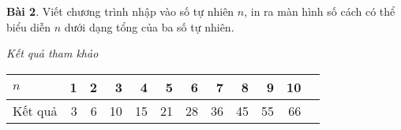 \documentclass[12pt, a4paper]{article}
\begin{document}
    \textbf{Bài 2}. Viết chương trình nhập vào số tự nhiên $n$, in ra màn hình số cách có thể biểu diễn $n$
    dưới dạng tổng của ba số tự nhiên.
    
    \textit{Kết quả tham khảo}
    \begin{table}[h]
        \centering
        \begin{tabular}{@{}lrrrrrrrrrrr@{}}
        \toprule
        $n$ &1 &2 &3 &4 &5 &6 &7 &8 &9 &10  \\ \midrule
        Kết quả &3 &6 &10 &15 &21 &28 &36 &45 &55 &66 \\ \bottomrule
        \end{tabular}
    \end{table}
\end{document}
